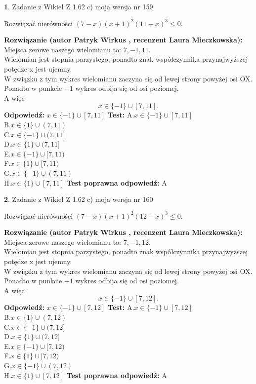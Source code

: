\documentclass[12pt, a4paper]{article}
\theoremstyle{definition} %
\newtheorem{zad}{}
\newcommand{\zadStart}[1]{\begin{zad}#1\newline}
\newcommand{\zadStop}{\end{zad}}
\newcommand{\rozwStart}[2]{\noindent \textbf{Rozwiązanie (autor #1 , recenzent #2): }\newline}
\newcommand{\rozwStop}{\newline}
\newcommand{\odpStart}{\noindent \textbf{Odpowiedź:}\newline}
\newcommand{\odpStop}{\newline}
\newcommand{\testStart}{\noindent \textbf{Test:}\newline}
\newcommand{\testStop}{\newline}
\newcommand{\kluczStart}{\noindent \textbf{Test poprawna odpowiedź:}\newline}
\newcommand{\kluczStop}{\newline}
\begin{document}
\zadStart{Zadanie z Wikieł Z 1.62 c) moja wersja nr 159}

Rozwiązać nierówności $(7-x)(x+1)^{2}(11-x)^{3}\le0$.
\zadStop
\rozwStart{Patryk Wirkus}{Laura Mieczkowska}
Miejsca zerowe naszego wielomianu to: $7, -1, 11$.\\
Wielomian jest stopnia parzystego, ponadto znak współczynnika przy\linebreak najwyższej potędze x jest ujemny.\\ W związku z tym wykres wielomianu zaczyna się od lewej strony powyżej osi OX.\\
Ponadto w punkcie $-1$ wykres odbija się od osi poziomej.\\
A więc $$x \in \{-1\} \cup [7,11].$$
\rozwStop
\odpStart
$x \in \{-1\} \cup [7,11]$
\odpStop
\testStart
A.$x \in \{-1\} \cup [7,11]$\\
B.$x \in \{1\} \cup (7,11)$\\
C.$x \in \{-1\} \cup (7,11]$\\
D.$x \in \{1\} \cup (7,11]$\\
E.$x \in \{-1\} \cup [7,11)$\\
F.$x \in \{1\} \cup [7,11)$\\
G.$x \in \{-1\} \cup (7,11)$\\
H.$x \in \{1\} \cup [7,11]$
\testStop
\kluczStart
A
\kluczStop



\zadStart{Zadanie z Wikieł Z 1.62 c) moja wersja nr 160}

Rozwiązać nierówności $(7-x)(x+1)^{2}(12-x)^{3}\le0$.
\zadStop
\rozwStart{Patryk Wirkus}{Laura Mieczkowska}
Miejsca zerowe naszego wielomianu to: $7, -1, 12$.\\
Wielomian jest stopnia parzystego, ponadto znak współczynnika przy\linebreak najwyższej potędze x jest ujemny.\\ W związku z tym wykres wielomianu zaczyna się od lewej strony powyżej osi OX.\\
Ponadto w punkcie $-1$ wykres odbija się od osi poziomej.\\
A więc $$x \in \{-1\} \cup [7,12].$$
\rozwStop
\odpStart
$x \in \{-1\} \cup [7,12]$
\odpStop
\testStart
A.$x \in \{-1\} \cup [7,12]$\\
B.$x \in \{1\} \cup (7,12)$\\
C.$x \in \{-1\} \cup (7,12]$\\
D.$x \in \{1\} \cup (7,12]$\\
E.$x \in \{-1\} \cup [7,12)$\\
F.$x \in \{1\} \cup [7,12)$\\
G.$x \in \{-1\} \cup (7,12)$\\
H.$x \in \{1\} \cup [7,12]$
\testStop
\kluczStart
A
\kluczStop
\end{document}
